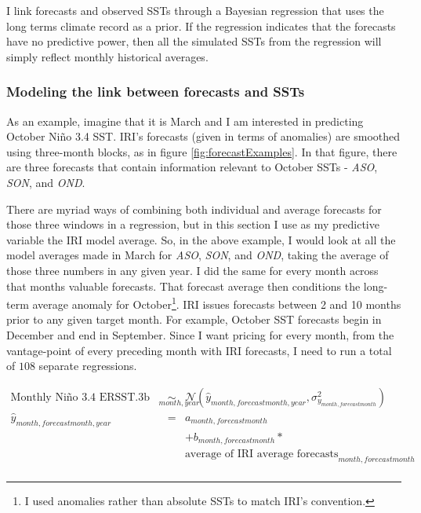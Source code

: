 \documentclass[authoryear]{article}
\begin{document}
I link forecasts and observed SSTs through a Bayesian regression that uses the long terms climate record as a prior. If the regression indicates that the forecasts have no predictive power, then all the simulated SSTs from the regression will simply reflect monthly historical averages. 

\subsubsection{Modeling the link between forecasts and SSTs}

As an example, imagine that it is March and I am interested in predicting October Ni\~no 3.4 SST. IRI's forecasts (given in terms of anomalies) are smoothed using three-month blocks, as in figure \ref{fig:forecastExamples}. In that figure, there are three forecasts that contain information relevant to October SSTs - \emph{ASO}, \emph{SON}, and \emph{OND}. 

There are myriad ways of combining both individual and average forecasts for those three windows in a regression, but in this section I use as my predictive variable the IRI model average. So, in the above example, I would look at all the model averages made in March for \emph{ASO}, \emph{SON}, and \emph{OND}, taking the average of those three numbers in any given year. I did the same for every month across that months valuable forecasts. That forecast average then conditions the long-term average anomaly for October\footnote{I used anomalies rather than absolute SSTs to match IRI's convention.}. IRI issues forecasts between 2 and 10 months prior to any given target month. For example, October SST forecasts begin in December and end in September. Since I want pricing for every month, from the vantage-point of every preceding month with IRI forecasts, I need to run a total of $108$ separate regressions. 

\begin{equation}
\begin{array}{lcl}
\mbox{Monthly Ni\~no 3.4 ERSST.3b anomalies}_{month,year} & \sim & \mathcal{N}( \hat{y}_{month,forecast month,year}, \sigma_{y_{month,forecast month}}^2 )\\
\hat{y}_{month,forecast month,year} & = & a_{month,forecast month} \\
&& + b_{month,forecast month}*\\
&& \mbox{average of IRI average forecasts}_{month,forecast month}\\
\end{array}
\label{eqn:conditionalEstEqn}
\end{equation}
\end{document}

